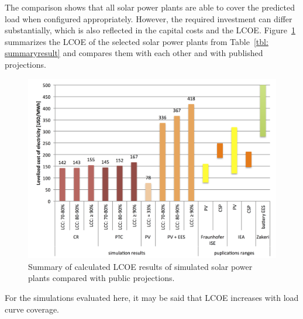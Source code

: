 The comparison shows that all solar power plants are able to cover the predicted load when configured appropriately. However, the required investment can differ substantially, which is also reflected in the capital costs and the LCOE. Figure~\ref{LCOEcomparision} summarizes the LCOE of the selected solar power plants from Table~\ref{tbl: summaryresult} and compares them with each other and with published projections.

\begin{figure}[htbp]  
\centering
\includegraphics[width=1\linewidth]{FIG/LCOEcomparision}
\caption{Summary of calculated LCOE results of simulated solar power plants compared with public projections.}\label{LCOEcomparision}
\end{figure}

For the simulations evaluated here, it may be said that LCOE increases with load curve coverage.


